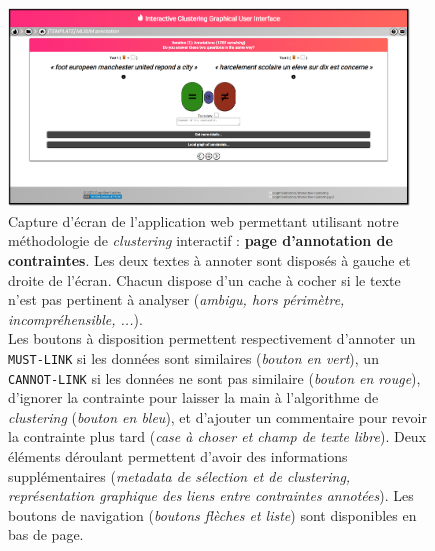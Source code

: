 			\begin{figure}[!htb]
				\centering
				\includegraphics[width=0.95\textwidth]{figures/etude-temps-annotation-0application-annotation}
				\caption{
					Capture d'écran de l'application web permettant utilisant notre méthodologie de \textit{clustering} interactif : \textbf{page d'annotation de contraintes}.
					Les deux textes à annoter sont disposés à gauche et droite de l'écran.
					Chacun dispose d'un cache à cocher si le texte n'est pas pertinent à analyser (\textit{ambigu, hors périmètre, incompréhensible, ...}).\\
					Les boutons à disposition permettent respectivement d'annoter un \texttt{MUST-LINK} si les données sont similaires (\textit{bouton en vert}), un \texttt{CANNOT-LINK} si les données ne sont pas similaire (\textit{bouton en rouge}), d'ignorer la contrainte pour laisser la main à l'algorithme de \textit{clustering} (\textit{bouton en bleu}), et d'ajouter un commentaire pour revoir la contrainte plus tard (\textit{case à choser et champ de texte libre}).
					Deux éléments déroulant permettent d'avoir des informations supplémentaires (\textit{metadata de sélection et de \textit{clustering}, représentation graphique des liens entre contraintes annotées}).
					Les boutons de navigation (\textit{boutons flèches et liste}) sont disponibles en bas de page.
				}
				\label{figure:4.3.1-ETUDE-COUTS-TEMPS-ANNOTATION-APPLICATION-ANNOTATION}
			\end{figure}
